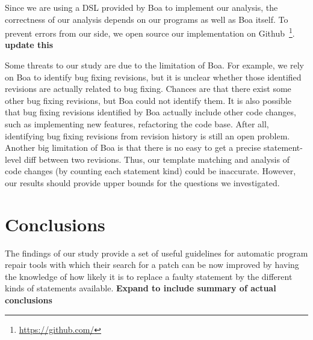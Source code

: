 \documentclass{sig-alternate-05-2015}
\newcommand{\todo}[1]
  {{\scriptsize \textbf{\color{red} {#1}}}}
\begin{document}
Since we are using a DSL provided by Boa to implement our analysis, the
correctness of our analysis depends on our programs as well as Boa itself. To
prevent errors from our side, we open source our implementation on
Github~\footnote{\url{https://github.com/}}.\todo{update
this}

Some threats to our study are due to the limitation of Boa. For example, we rely
on Boa to identify bug fixing revisions, but it is unclear whether those
identified revisions are actually related to bug fixing. Chances are that there
exist some other bug fixing revisions, but Boa could not identify them. It is
also possible that bug fixing revisions identified by Boa actually include other
code changes, such as implementing new features, refactoring the code base.
After all, identifying bug fixing revisions from revision history is still an
open problem. Another big limitation of Boa is that there is no easy to get a
precise statement-level diff between two revisions. Thus, our template matching
and analysis of code changes (by counting each statement kind) could be
inaccurate. However, our results should provide upper bounds for the questions
we investigated. 

\section{Conclusions}
The findings of our study provide a set of useful guidelines for automatic
program repair tools with which their search for a patch can be now improved by
having the knowledge of how likely it is to replace a faulty statement by the
different kinds of statements available.
\todo{Expand to include summary of actual conclusions}






%
%


\end{document}
